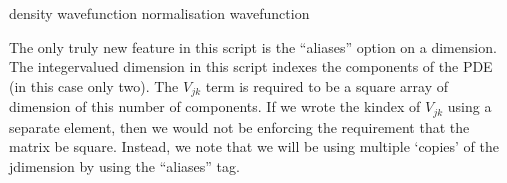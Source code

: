 \documentclass[letterpaper,10pt,english]{sphinxmanual}
\begin{document}
\begin{sphinxVerbatim}[commandchars=\\\{\}]
      
      density
      wavefunction
      \PYG{c+cp}{\PYGZlt{}![CDATA[}
          
      \PYG{c+cp}{]]\PYGZgt{}}
      
      normalisation
      wavefunction
      \PYG{c+cp}{\PYGZlt{}![CDATA[}
          
      \PYG{c+cp}{]]\PYGZgt{}}
\end{sphinxVerbatim}

\ignorespaces 
\sphinxAtStartPar
The only truly new feature in this script is the “aliases” option on a dimension.  The integer\sphinxhyphen{}valued dimension in this script indexes the components of the PDE (in this case only two).  The  \(V_{j k}\) term is required to be a square array of dimension of this number of components.  If we wrote the k\sphinxhyphen{}index of \(V_{j k}\) using a separate  element, then we would not be enforcing the requirement that the matrix be square.  Instead, we note that we will be using multiple ‘copies’ of the j\sphinxhyphen{}dimension by using the “aliases” tag.

\begin{sphinxVerbatim}[commandchars=\\\{\}]
     
\end{sphinxVerbatim}
\end{document}
